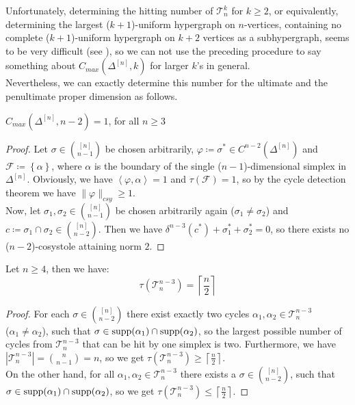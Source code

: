 Unfortunately, determining the hitting number of \(\mathcal{T}_n^k\) for \(k\geq 2\), or equivalently, determining the largest (\(k+1\))-uniform hypergraph on \(n\)-vertices, containing no complete (\(k+1\))-uniform hypergraph on \(k+2\) vertices as a subhypergraph, seems to be very difficult (see \cite{7}), so we can not use the preceding procedure to say something about \(C_{max}(\Delta^{[n]},k)\) for larger \(k\)'s in general.\\
Nevertheless, we can exactly determine this number for the ultimate and the penultimate proper dimension as follows.

\begin{thm}\label{theorem7}
\(C_{max}(\Delta^{[n]},n-2)=1\), for all \(n\geq 3\)
\begin{proof}
Let \(\sigma\in\binom{[n]}{n-1}\) be chosen arbitrarily, \(\varphi\coloneqq \sigma^*\in C^{n-2}(\Delta^{[n]})\) and\\
\(\mathcal{F}\coloneqq \left\{\alpha\right\}\), where \(\alpha\) is the boundary of the single (\(n-1\))-dimensional simplex in \(\Delta^{[n]}\). Obviously, we have \(\left\langle\varphi,\alpha\right\rangle=1\) and \(\tau(\mathcal{F})=1\), so by the cycle detection theorem we have \(\|\varphi\|_{csy}\geq 1\).\\
Now, let \(\sigma_1,\sigma_2\in\binom{[n]}{n-1}\) be chosen arbitrarily again (\(\sigma_1\neq\sigma_2\)) and \(c\coloneqq \sigma_1\cap\sigma_2\in\binom{[n]}{n-2}\). Then we have \(\delta^{n-3}(c^*)+\sigma_1^*+\sigma_2^*=0\), so there exists no (\(n-2\))-cosystole attaining norm \(2\).
\end{proof}
\end{thm}

\begin{lem}\label{lemma12}
Let \(n\geq 4\), then we have:
\[
\tau(\mathcal{T}_n^{n-3})=\left\lceil\frac{n}{2}\right\rceil
\]
\begin{proof}
For each \(\sigma\in\binom{[n]}{n-2}\) there exist exactly two cycles \(\alpha_1,\alpha_2\in\mathcal{T}_n^{n-3}\)\\
(\(\alpha_1\neq\alpha_2\)), such that \(\sigma\in \mathrm{supp}(\alpha_1)\cap \mathrm{supp}(\alpha_2)\), so the largest possible number of cycles from \(\mathcal{T}_n^{n-3}\) that can be hit by one simplex is two. Furthermore, we have \(\left|\mathcal{T}_n^{n-3}\right|=\binom{n}{n-1}=n\), so we get \(\tau(\mathcal{T}_n^{n-3})\geq\left\lceil\frac{n}{2}\right\rceil\).\\
On the other hand, for all \(\alpha_1,\alpha_2\in\mathcal{T}_n^{n-3}\) there exists a \(\sigma\in\binom{[n]}{n-2}\), such that\\
\(\sigma\in \mathrm{supp}(\alpha_1)\cap \mathrm{supp}(\alpha_2)\), so we get \(\tau(\mathcal{T}_n^{n-3})\leq\left\lceil\frac{n}{2}\right\rceil\).
\end{proof}
\end{lem}

